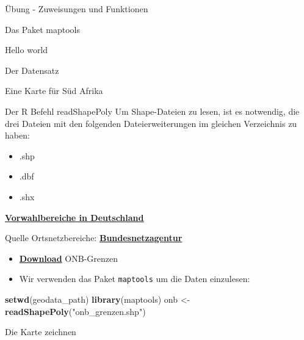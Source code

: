 \documentclass[ignorenonframetext,]{beamer}
\newenvironment{Shaded}{\begin{snugshade}}{\end{snugshade}}
\newcommand{\KeywordTok}[1]{\textcolor[rgb]{0.26,0.66,0.93}{\textbf{#1}}}
\newcommand{\NormalTok}[1]{\textcolor[rgb]{0.74,0.68,0.62}{#1}}
\newcommand{\StringTok}[1]{\textcolor[rgb]{0.02,0.61,0.04}{#1}}
\providecommand{\tightlist}{%
  \setlength{\itemsep}{0pt}\setlength{\parskip}{0pt}}
\begin{document}
\begin{frame}[fragile]{Übung - Zuweisungen und Funktionen}
\begin{frame}[fragile]{Das Paket maptools}
\begin{frame}[fragile]{Hello world}
\begin{frame}[fragile]{Der Datensatz}
\begin{frame}[fragile]{Eine Karte für Süd Afrika}
\begin{frame}{Der R Befehl readShapePoly}
Um Shape-Dateien zu lesen, ist es notwendig, die drei Dateien mit den
folgenden Dateierweiterungen im gleichen Verzeichnis zu haben:

\begin{itemize}
\tightlist
\item
  .shp
\item
  .dbf
\item
  .shx
\end{itemize}

\end{frame}

\begin{frame}[fragile]{\href{http://www.bundesnetzagentur.de/SharedDocs/Downloads/DE/Sachgebiete/Telekommunikation/Unternehmen_Institutionen/Nummerierung/Rufnummern/ONVerzeichnisse/ONBGrenzen/ONB_Grenzen.html}{\textbf{Vorwahlbereiche
in Deutschland}}}
\protect\hypertarget{vorwahlbereiche-in-deutschland}{}

\begin{block}{Quelle Ortsnetzbereiche:
\href{https://www.bundesnetzagentur.de/DE/Sachgebiete/Telekommunikation/Unternehmen_Institutionen/Nummerierung/Rufnummern/ONRufnr/ON_Einteilung_ONB/ON_ONB_ONKz_ONBGrenzen_Basepage.html}{\textbf{Bundesnetzagentur}}}

\begin{itemize}
\item
  \href{https://www.bundesnetzagentur.de/SharedDocs/Downloads/DE/Sachgebiete/Telekommunikation/Unternehmen_Institutionen/Nummerierung/Rufnummern/ONVerzeichnisse/ONBGrenzen/ONB-Grenzen-2018.zip?__blob=publicationFile\&v=21}{\textbf{Download}}
  ONB-Grenzen
\item
  Wir verwenden das Paket \texttt{maptools} um die Daten einzulesen:
\end{itemize}

\begin{Shaded}
\begin{Highlighting}[]
\KeywordTok{setwd}\NormalTok{(geodata_path)}
\KeywordTok{library}\NormalTok{(maptools)}
\NormalTok{onb <-}\StringTok{ }\KeywordTok{readShapePoly}\NormalTok{(}\StringTok{"onb_grenzen.shp"}\NormalTok{)}
\end{Highlighting}
\end{Shaded}

\end{block}

\end{frame}

\begin{frame}[fragile]{Die Karte zeichnen}
\protect\hypertarget{die-karte-zeichnen}{}


\end{frame}
\end{frame}
\end{frame}
\end{frame}
\end{frame}
\end{frame}
\end{document}
